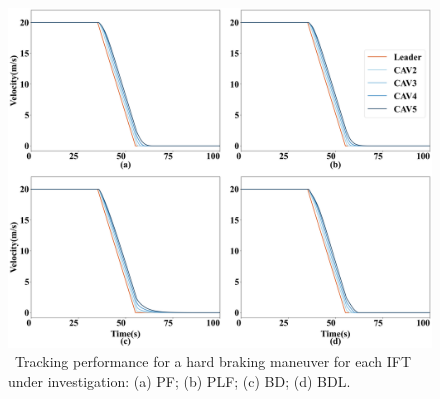 \documentclass[a4paper]{cas-sc}
\begin{document}
\begin{figure}

  \centering
  \includegraphics[width=14cm]{figs/fig7.png}
  \caption{~Tracking performance for a hard braking maneuver for each IFT under investigation: (a) PF; (b) PLF; (c) BD; (d) BDL.}
  \label{fig7}
\end{figure}
\end{document}
